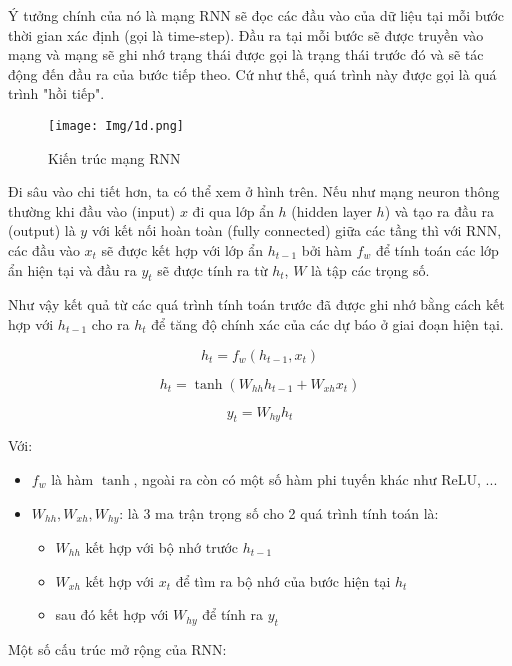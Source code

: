 \documentclass[12pt]{report}
\begin{document}
Ý tưởng chính của nó là mạng RNN sẽ đọc các đầu vào của dữ liệu tại mỗi bước thời gian xác định (gọi là time-step). Đầu ra tại mỗi bước sẽ được truyền vào mạng và mạng sẽ ghi nhớ trạng thái được gọi là trạng thái trước đó và sẽ tác động đến đầu ra của bước tiếp theo. Cứ như thế, quá trình này được gọi là quá trình "hồi tiếp".

\vspace{1em}
\begin{figure}[H]
    \centering
    \texttt{[image: Img/1d.png]}
    \caption{Kiến trúc mạng RNN}
    \label{fig:2.9}
\end{figure}
\vspace{0.5em}

Đi sâu vào chi tiết hơn, ta có thể xem ở hình trên. Nếu như mạng neuron thông thường khi đầu vào (input) \( x \) đi qua lớp ẩn \( h \) (hidden layer \( h \)) và tạo ra đầu ra (output) là \( y \) với kết nối hoàn toàn (fully connected) giữa các tầng thì với RNN, các đầu vào \( x_t \) sẽ được kết hợp với lớp ẩn \( h_{t-1} \) bởi hàm \( f_w \) để tính toán các lớp ẩn hiện tại và đầu ra \( y_t \) sẽ được tính ra từ \( h_t \), \( W \) là tập các trọng số.

Như vậy kết quả từ các quá trình tính toán trước đã được ghi nhớ bằng cách kết hợp với \( h_{t-1} \) cho ra \( h_t \) để tăng độ chính xác của các dự báo ở giai đoạn hiện tại.

\[
h_t = f_w(h_{t-1}, x_t)
\]

\[
h_t = \tanh(W_{hh} h_{t-1} + W_{xh} x_t)
\]

\[
y_t = W_{hy} h_t
\]

Với:
\begin{itemize}
    \item \( f_w \) là hàm \( \tanh \), ngoài ra còn có một số hàm phi tuyến khác như ReLU, ...
    \item \( W_{hh}, W_{xh}, W_{hy} \): là 3 ma trận trọng số cho 2 quá trình tính toán là:
    \begin{itemize}
        \item \( W_{hh} \) kết hợp với bộ nhớ trước \( h_{t-1} \)
        \item \( W_{xh} \) kết hợp với \( x_t \) để tìm ra bộ nhớ của bước hiện tại \( h_t \)
        \item sau đó kết hợp với \( W_{hy} \) để tính ra \( y_t \)
    \end{itemize}
\end{itemize}

Một số cấu trúc mở rộng của RNN:
\end{document}
